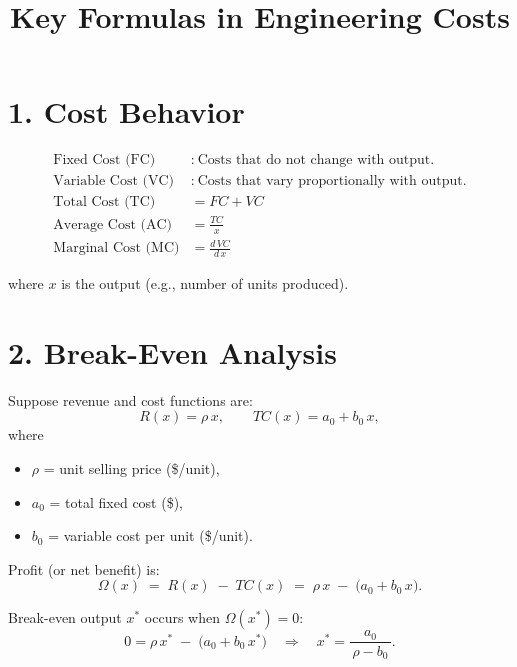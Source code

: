\documentclass[11pt]{article}
\title{Key Formulas in Engineering Costs}
\author{}
\date{}
\begin{document}
\maketitle

\section*{1. Cost Behavior}

\begin{align}
  \text{Fixed Cost (FC)} &:\ \text{Costs that do not change with output.} \nonumber \\
  \text{Variable Cost (VC)} &:\ \text{Costs that vary proportionally with output.} \nonumber \\
  \text{Total Cost (TC)} &= FC + VC \label{eq:tc} \\
  \text{Average Cost (AC)} &= \frac{TC}{x} \label{eq:ac} \\
  \text{Marginal Cost (MC)} &= \frac{d\,VC}{d\,x} \label{eq:mc}
\end{align}

\noindent where \( x \) is the output (e.g., number of units produced).

\section*{2. Break-Even Analysis}

Suppose revenue and cost functions are:
\[
  R(x) = \rho \, x, 
  \qquad
  TC(x) = a_0 + b_0 \, x,
\]
where
\begin{itemize}
  \item \(\rho\) = unit selling price (\$/unit),
  \item \(a_0\) = total fixed cost (\$),
  \item \(b_0\) = variable cost per unit (\$/unit).
\end{itemize}

\noindent Profit (or net benefit) is:
\begin{equation}
  \Omega(x) \;=\; R(x) \;-\; TC(x) \;=\; \rho\,x \;-\; \bigl(a_0 + b_0\,x\bigr).
\end{equation}

\noindent Break-even output \( x^* \) occurs when \( \Omega(x^*) = 0 \):
\begin{equation}
  0 = \rho\,x^* \;-\; \bigl(a_0 + b_0\,x^*\bigr)
  \quad\Longrightarrow\quad
  x^* 
  = \frac{a_0}{\,\rho - b_0\,}.
  \label{eq:breakeven}
\end{equation}
\end{document}
